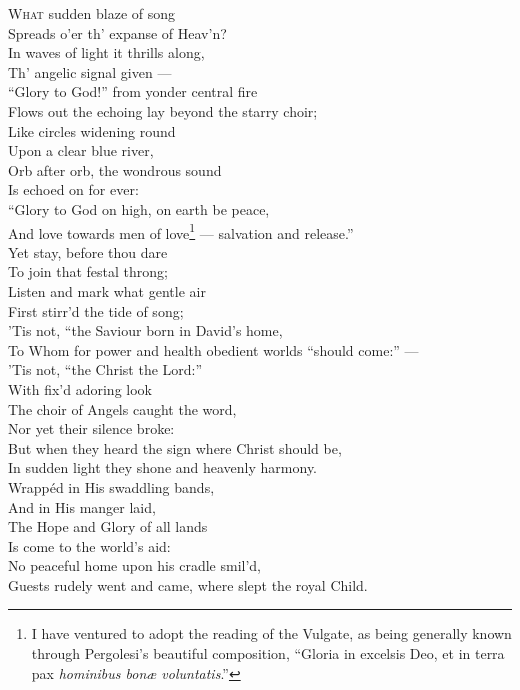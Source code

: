 \textsc{What} sudden blaze of song \\
 Spreads o’er th’ expanse of Heav’n? \\
 In waves of light it thrills along, \\
 Th’ angelic signal given — \\
 “Glory to God!” from yonder central fire \\
 Flows out the echoing lay beyond the starry choir; \\
  Like circles widening round \\
 Upon a clear blue river, \\
 Orb after orb, the wondrous sound \\
 Is echoed on for ever: \\
 “Glory to God on high, on earth be peace, \\
 And love towards men of love\footnote{I have ventured to adopt the reading of the Vulgate, as being generally known through Pergolesi’s beautiful composition, “Gloria in excelsis Deo, et in terra pax \emph{hominibus bonæ voluntatis}.”} — salvation and release.” \\
  Yet stay, before thou dare \\
 To join that festal throng; \\
 Listen and mark what gentle air \\
 First stirr’d the tide of song; \\
 ’Tis not, “the Saviour born in David’s home, \\
 To Whom for power and health obedient worlds “should come:” — \\
  ’Tis not, “the Christ the Lord:” \\
 With fix’d adoring look \\
 The choir of Angels caught the word, \\
 Nor yet their silence broke: \\
 But when they heard the sign where Christ should be, \\
 In sudden light they shone and heavenly harmony. \\
  Wrappéd in His swaddling bands, \\
 And in His manger laid, \\
 The Hope and Glory of all lands \\
 Is come to the world’s aid: \\
 No peaceful home upon his cradle smil’d, \\
 Guests rudely went and came, where slept the royal Child. \\
